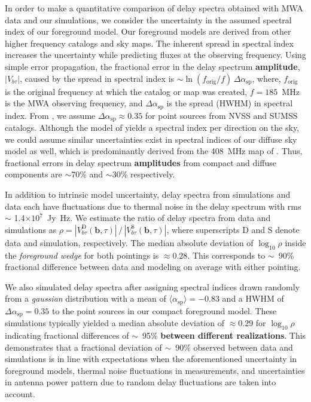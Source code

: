 \documentclass[preprint2,iop,numberedappendix]{emulateapj}
\begin{document}
In order to make a quantitative comparison of delay spectra obtained with MWA data and our simulations, we consider the uncertainty in the assumed spectral index of our foreground model. Our foreground models are derived from other higher frequency catalogs and sky maps. The inherent spread in spectral index increases the uncertainty while predicting fluxes at the observing frequency. Using simple error propagation, the fractional error in the delay spectrum {\bf amplitude}, $|V_{b\tau}|$, caused by the spread in spectral index is $\sim \ln(f_\textrm{orig}/f)\,\Delta\alpha_\textrm{sp}$, where, $f_\textrm{orig}$ is the original frequency at which the catalog or map was created, $f=185$~MHz is the MWA observing frequency, and $\Delta\alpha_\textrm{sp}$ is the spread (HWHM) in spectral index. From \citet{mau03}, we assume $\Delta\alpha_\textrm{sp} \approx 0.35$ for point sources from NVSS and SUMSS catalogs. Although the model of \citet{deo08} yields a spectral index per direction on the sky, we could assume similar uncertainties exist in spectral indices of our diffuse sky model as well, which is predominantly derived from the 408~MHz map of \citet{has82}. Thus, fractional errors in delay spectrum {\bf amplitudes} from compact and diffuse components are $\sim$70\% and $\sim$30\% respectively. 

In addition to intrinsic model uncertainty, delay spectra from simulations and data each have fluctuations due to thermal noise in the delay spectrum with rms $\sim$ 1.4$\times 10^7$~Jy~Hz. We estimate the ratio of delay spectra from data and simulations as $\rho = |V^\textrm{D}_{b\tau}(\boldsymbol{b},\tau)|\,/\,|V^\textrm{S}_{b\tau}(\boldsymbol{b},\tau)|$, where superscripts D and S denote data and simulation, respectively. The median absolute deviation of $\log_{10}\rho$ inside the {\it foreground wedge} for both pointings is $\approx 0.28$. This corresponds to $\sim$~90\% fractional difference between data and modeling on average with either pointing. 

We also simulated delay spectra after assigning spectral indices drawn randomly from a {\it gaussian} distribution with a mean of $\langle\alpha_\textrm{sp}\rangle=-0.83$ and a HWHM of $\Delta\alpha_\textrm{sp}=0.35$ to the point sources in our compact foreground model. These simulations typically yielded a median absolute deviation of $\approx 0.29$ for $\log_{10}\rho$ indicating fractional differences of $\sim$~95\% {\bf between different realizations}. This demonstrates that a fractional deviation of $\sim$~90\% observed between data and simulations is in line with expectations when the aforementioned uncertainty in foreground models, thermal noise fluctuations in measurements, and uncertainties in antenna power pattern due to random delay fluctuations are taken into account. 
\end{document}
